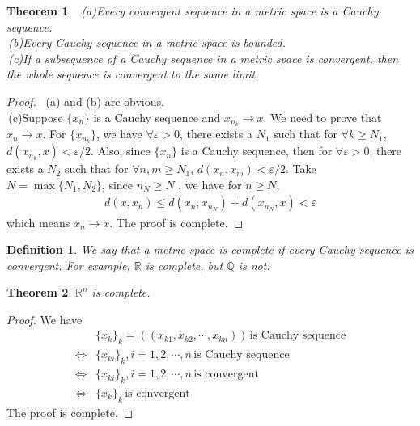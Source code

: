\documentclass[12pt,leqno]{amsart}
\newtheorem{theorem}{Theorem}[section]
\newtheorem{definition}{Definition}[section]
\theoremstyle{definition}
\begin{document}
\begin{theorem}
$ $ \newline
\hspace*{1em}\,(a)Every convergent sequence in a metric space is a Cauchy sequence. \\
\hspace*{1em}\,(b)Every Cauchy sequence in a metric space is bounded.\\
\hspace*{1em}\,(c)If a subsequence of a Cauchy sequence in a metric space is convergent, then the whole sequence is convergent to the same limit.
\end{theorem}
\begin{proof}
$ $ \newline
\hspace*{1em}\,(a) and (b) are obvious.\\
\hspace*{1em}\,(c)Suppose $\{x_n\}$ is a Cauchy sequence and $x_{n_k}\to x$. We need to prove that $x_n\to x$. For $\{x_{n_k}\}$, we have $\forall \varepsilon > 0$, there exists a $N_1$ such that for $\forall k \geq N_1$, $d(x_{n_k},x)<\varepsilon/2$. Also, since $\{x_n\}$ is a Cauchy sequence, then for $\forall \varepsilon > 0$, there exists a $N_2$ such that for $\forall n,m \geq N_1$, $d(x_n,x_m)<\varepsilon/2$. Take $N = \max\{N_1, N_2\}$, since $n_N \geq N$ , we have for $n \geq N$,
\begin{align*}
    d(x,x_n) \leq d(x_n, x_{n_N}) + d(x_{n_N}, x) < \varepsilon
\end{align*}
which means $x_n\to x$. The proof is complete.
\end{proof}

\medskip

\begin{definition}
We say that a metric space is complete if every Cauchy sequence is convergent. For example, $\mathbb{R}$ is complete, but $\mathbb{Q}$ is not.
\end{definition}

\medskip

\begin{theorem}
$\mathbb{R}^n$ is complete.
\end{theorem}
\begin{proof}
We have 
\begin{align*}
    & \{x_k\}_k = ((x_{k1},x_{k2},\cdots, x_{kn}))\,\text{is Cauchy sequence} \\
    \Leftrightarrow & \{x_{ki}\}_k, i = 1,2,\cdots, n \,\text{is Cauchy sequence} \\
    \Leftrightarrow & \{x_{ki}\}_k, i = 1,2,\cdots, n \,\text{is convergent} \\
    \Leftrightarrow & \{x_k\}_k\,\text{is convergent}
\end{align*}
The proof is complete.
\end{proof}
\end{document}
